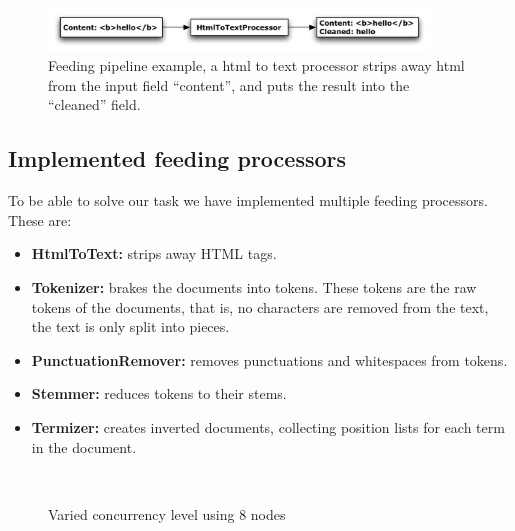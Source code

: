 \documentclass[]{article}
\begin{document}
\begin{figure}[htb]
	\centering
	\includegraphics[width=0.9\textwidth]{processor.pdf}
	\caption[Feeding pipeline example]{Feeding pipeline example, a html to text processor strips away html from the input field ``content'', and puts the result into the ``cleaned'' field.}\label{fig:feeding_processor}
\end{figure}

\subsection{Implemented feeding processors}\label{sub:implemented_feeding_processors}
To be able to solve our task we have implemented multiple feeding processors. These are:

\begin{itemize}
	\item \textbf{HtmlToText:} strips away HTML tags.
	\item \textbf{Tokenizer:} brakes the documents into tokens. These tokens are the raw tokens of the documents, that is, no characters are removed from the text, the text is only split into pieces.
	\item \textbf{PunctuationRemover:} removes punctuations and whitespaces from tokens. 
	\item \textbf{Stemmer:} reduces tokens to their stems. 
	\item \textbf{Termizer:} creates inverted documents, collecting position lists for each term in the document.
\end{itemize}


\begin{figure}[htbp]
	\begin{center}
    \mbox{
	}
	\caption{\label{fig:res3} Varied concurrency level using 8 nodes}
	\end{center}
\end{figure}
\end{document}
